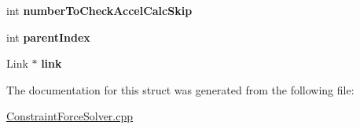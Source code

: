 \begin{DoxyCompactItemize}
\item 
\hypertarget{structOpenHRP_1_1CFSImpl_1_1LinkData_a82a0a28f6f7363416101f2f6f41e55a5}{int {\bfseries number\-To\-Check\-Accel\-Calc\-Skip}}\label{structOpenHRP_1_1CFSImpl_1_1LinkData_a82a0a28f6f7363416101f2f6f41e55a5}

\item 
\hypertarget{structOpenHRP_1_1CFSImpl_1_1LinkData_a5987d86a8029fd49bf630e7cb822f920}{int {\bfseries parent\-Index}}\label{structOpenHRP_1_1CFSImpl_1_1LinkData_a5987d86a8029fd49bf630e7cb822f920}

\item 
\hypertarget{structOpenHRP_1_1CFSImpl_1_1LinkData_a7bf17d5c4da24fc690fb8a6de3efa54d}{Link $\ast$ {\bfseries link}}\label{structOpenHRP_1_1CFSImpl_1_1LinkData_a7bf17d5c4da24fc690fb8a6de3efa54d}

\end{DoxyCompactItemize}


The documentation for this struct was generated from the following file\-:\begin{DoxyCompactItemize}
\item 
\hyperlink{ConstraintForceSolver_8cpp}{Constraint\-Force\-Solver.\-cpp}\end{DoxyCompactItemize}
